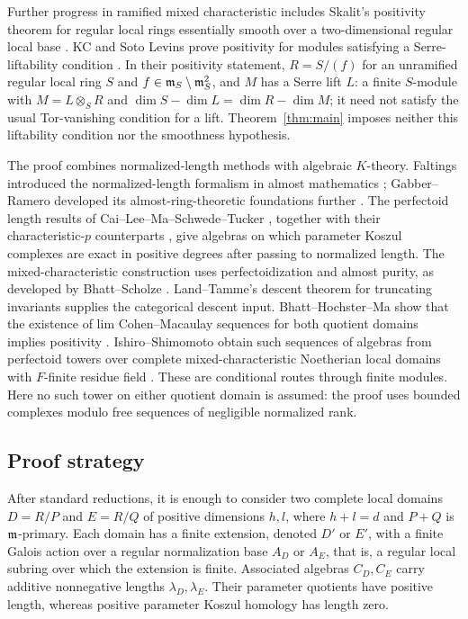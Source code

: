 Further progress in ramified mixed characteristic includes Skalit's
positivity theorem for regular local rings essentially smooth over a
two-dimensional regular local base \cite{Skalit}. KC and Soto Levins
prove positivity for modules satisfying a Serre-liftability condition
\cite[Theorem~A]{KCSotoLevins}. In their positivity statement,
$R=S/(f)$ for an unramified regular local ring $S$ and
$f\in\mathfrak{m}_S\setminus\mathfrak{m}_S^2$, and $M$ has a Serre lift $L$:
a finite $S$-module with $M=L\otimes_S R$ and
$\dim S-\dim L=\dim R-\dim M$; it need not satisfy the usual
Tor-vanishing condition for a lift. Theorem~\ref{thm:main} imposes
neither this liftability condition nor the smoothness hypothesis.

The proof combines normalized-length methods with algebraic $K$-theory.
Faltings introduced the normalized-length formalism in almost
mathematics \cite[Appendix~2]{Faltings}; Gabber--Ramero developed its
almost-ring-theoretic foundations further \cite{GabberRamero}.
The perfectoid length results of Cai--Lee--Ma--Schwede--Tucker
\cite{CLMST}, together with their characteristic-$p$ counterparts
\cite{Ma}, give algebras on which parameter Koszul complexes are exact
in positive degrees after passing to normalized length. The mixed-characteristic
construction uses perfectoidization and almost purity, as developed by
Bhatt--Scholze \cite{BhattScholze}. Land--Tamme's
descent theorem for truncating invariants \cite{LT} supplies the
categorical descent input. Bhatt--Hochster--Ma show that the existence
of lim Cohen--Macaulay sequences for both quotient domains implies
positivity \cite[Theorem~6.1]{BHM}. Ishiro--Shimomoto obtain such
sequences of algebras from perfectoid towers over complete
mixed-characteristic Noetherian local domains with $F$-finite residue field
\cite[Theorem~3.17]{IshiroShimomoto}. These are conditional routes
through finite modules. Here no such tower on either quotient domain
is assumed: the proof uses bounded complexes modulo free sequences
of negligible normalized rank.

\subsection{Proof strategy}

After standard reductions, it is enough to consider two complete local
domains $D=R/P$ and $E=R/Q$ of positive dimensions $h,l$, where
$h+l=d$ and $P+Q$ is $\mathfrak{m}$-primary. Each domain has a finite extension,
denoted $D'$ or $E'$, with a finite Galois action over a regular
normalization base $A_D$ or $A_E$, that is, a regular local subring
over which the extension is finite. Associated algebras $C_D,C_E$ carry additive
nonnegative lengths $\lambda_D,\lambda_E$. Their parameter quotients
have positive length, whereas positive parameter Koszul homology has
length zero.

